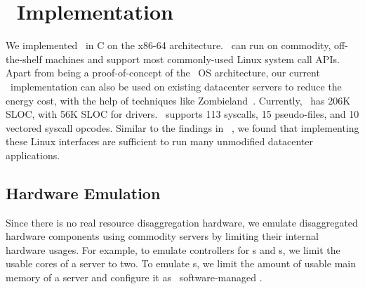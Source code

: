 \section{\lego\ Implementation}
\label{sec:lego:impl}

We implemented \lego\ in C on the x86-64 architecture.
\lego\ can run on commodity, off-the-shelf machines 
and support most commonly-used Linux system call APIs.
Apart from being a proof-of-concept of the \splitkernel\ OS architecture,
our current \lego\ implementation can also be used on existing datacenter servers to reduce the energy cost,
with the help of techniques like Zombieland~\cite{Nitu18-EUROSYS}.
Currently, \lego\ has 206K SLOC,
with 56K SLOC for drivers.
\lego\ supports 113 syscalls, 15 pseudo-files,
and 10 vectored syscall opcodes. 
Similar to the findings in ~\cite{tsai-eurosys16}, we found that implementing these Linux interfaces
are sufficient to run many unmodified datacenter applications.

\subsection{Hardware Emulation}
Since there is no real resource disaggregation hardware,
we emulate disaggregated hardware components using commodity servers 
by limiting their internal hardware usages.
For example, to emulate controllers for \mcomponent{}s and \scomponent{}s, 
we limit the usable cores of a server to two.
To emulate \pcomponent{}s, we limit the amount of usable main memory of a server
and configure it as \lego\ software-managed \excache.

